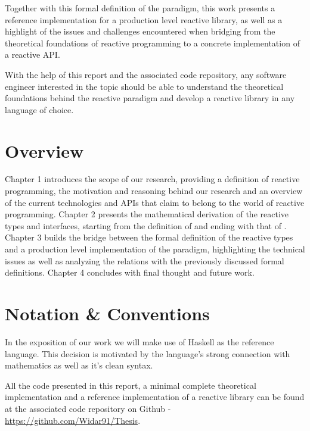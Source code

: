 Together with this formal definition of the paradigm, this work presents a reference implementation for a production level reactive library, as well as a highlight of the issues and challenges encountered when bridging from the theoretical foundations of reactive programming to a concrete implementation of a reactive API. 

With the help of this report and the associated code repository, any software engineer interested in the topic should be able to understand the theoretical foundations behind the reactive paradigm and develop a reactive library in any language of choice.

\section*{Overview}

Chapter 1 introduces the scope of our research, providing a definition of reactive programming, the motivation and reasoning behind our research and an overview of the current technologies and APIs that claim to belong to the world of reactive programming. Chapter 2 presents the mathematical derivation of the reactive types and interfaces, starting from the definition of  and ending with that of . Chapter 3 builds the bridge between the formal definition of the reactive types and a production level implementation of the paradigm, highlighting the technical issues as well as analyzing the relations with the previously discussed formal definitions. Chapter 4 concludes with final thought and future work.

\section*{Notation \& Conventions}

In the exposition of our work we will make use of Haskell as the reference language. This decision is motivated by the language's strong connection with mathematics as well as it's clean syntax.

All the code presented in this report, a minimal complete theoretical implementation and a reference implementation of a reactive library can be found at the associated code repository on Github - \url{https://github.com/Widar91/Thesis}. 
